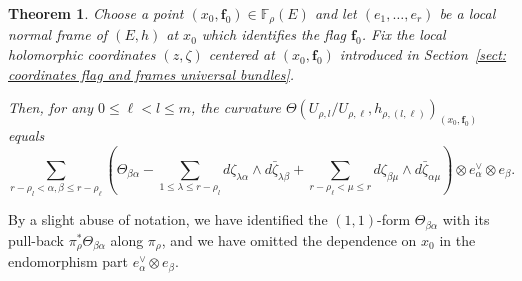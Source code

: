 \documentclass[a4paper]{amsart}
\theoremstyle{plain}%
\newtheorem{theorem}{Theorem}[section]
\theoremstyle{definition}
\theoremstyle{remark}
\newcommand{\FF}{\mathbb{F}}
\begin{document}
\begin{theorem}\label{thm: curvature of natural bundles}
	Choose a point $ (x_0,\mathbf{f}_0) \in \FF_{\rho}(E) $ and let $ (e_1,\dots,e_r) $ be a local normal frame of $ (E,h) $ at $ x_0 $ which identifies the flag $ \mathbf{f}_0 $.
	Fix the local holomorphic coordinates $ (z,\zeta) $ centered at $ (x_0,\mathbf{f}_0) $ introduced in Section~\ref{sect: coordinates flag and frames universal bundles}.
	
	Then, for any $ 0 \le \ell < l \le m $, the curvature $ \Theta(U_{\rho,l}/U_{\rho,\ell},h_{\rho,(l,\ell)})_{(x_0,\mathbf{f}_0)} $ equals
		\begin{equation*}
			\sum_{r-\rho_l < \alpha,\beta \le r-\rho_{\ell}}
			\left(
			\Theta_{\beta\alpha}
			- \sum_{1 \le \lambda \le r-\rho_l} d\zeta_{\lambda\alpha} \wedge d\bar{\zeta}_{\lambda\beta}
			+ \sum_{r-\rho_{\ell} < \mu \le r} d{\zeta}_{\beta\mu} \wedge d\bar{\zeta}_{\alpha\mu}
			\right) \otimes {e_\alpha^\vee} \otimes {e_\beta} .
		\end{equation*}

\end{theorem}

By a slight abuse of notation, we have identified the $ (1,1) $-form $ \Theta_{\beta\alpha} $ with its pull-back $ \pi_{\rho}^{*} \Theta_{\beta\alpha} $ along $ \pi_{\rho} $, and we have omitted the dependence on $ x_0 $ in the endomorphism part $ {e_\alpha^\vee} \otimes {e_\beta} $.
\end{document}
